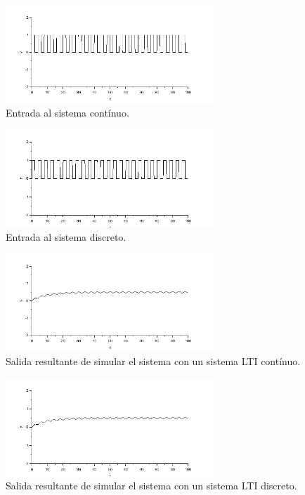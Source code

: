 \documentclass{article}
\begin{document}
        \begin{figure}[h!]
            \centering
            \includegraphics[width=0.7\textwidth]{./Imagenes/Simulaciones/entradaContinua.png}
            \caption{Entrada al sistema contínuo.}
            \label{entradaContinua}
        \end{figure}

        \begin{figure}[h!]
            \centering
            \includegraphics[width=0.7\textwidth]{./Imagenes/Simulaciones/entradaDiscreta.png}
            \caption{Entrada al sistema discreto.}
            \label{entradaDiscreta}
        \end{figure}
        
         \begin{figure}[h!]
            \centering
            \includegraphics[width=0.7\textwidth]{./Imagenes/Simulaciones/salidaContinua.png}
            \caption{Salida resultante de simular el sistema con un sistema LTI contínuo.}
            \label{salidaContinua}
        \end{figure}
        
              \begin{figure}[h!]
            \centering
            \includegraphics[width=0.7\textwidth]{./Imagenes/Simulaciones/salidaDiscreta.png}
            \caption{Salida resultante de simular el sistema con un sistema LTI discreto.}
            \label{salidaDiscreta}
        \end{figure}
\end{document}
